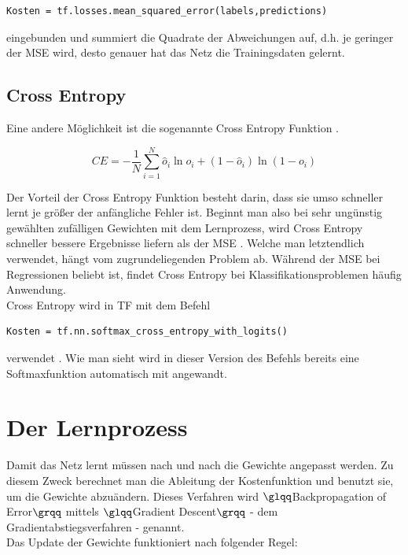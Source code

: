 \vspace{0.3cm}
\begin{lstlisting}
Kosten = tf.losses.mean_squared_error(labels,predictions)
\end{lstlisting}

eingebunden und summiert die Quadrate der Abweichungen auf, d.h. je geringer der \gls{MSE} wird, desto genauer hat das Netz die Trainingsdaten gelernt.


\subsection{Cross Entropy}
Eine andere M\"oglichkeit ist die sogenannte Cross Entropy Funktion \cite{Nielsen}.

\begin{equation}
CE= - \frac{1}{N} \sum_{i=1}^{N}\hat{o}_i \ln o_i + (1- \hat{o}_i) \ln (1-o_i)
\end{equation}

Der Vorteil der Cross Entropy Funktion besteht darin, dass sie umso schneller lernt je gr\"o\ss er der anf\"angliche Fehler ist. Beginnt man also bei sehr ung\"unstig gew\"ahlten zuf\"alligen Gewichten mit dem Lernprozess, wird Cross Entropy schneller bessere Ergebnisse liefern als der \gls{MSE} \cite{Nielsen}. Welche man letztendlich verwendet, h\"angt vom zugrundeliegenden Problem ab. Während der \gls{MSE} bei Regressionen beliebt ist, findet Cross Entropy bei Klassifikationsproblemen häufig Anwendung.\\
Cross Entropy wird in \gls{TF} mit dem Befehl

\vspace{0.3cm} 
\begin{lstlisting}
Kosten = tf.nn.softmax_cross_entropy_with_logits()
\end{lstlisting}

verwendet \cite{cookbook}. Wie man sieht wird in dieser Version des Befehls bereits eine Softmaxfunktion automatisch mit angewandt.



\section{Der Lernprozess}
Damit das Netz lernt m\"ussen nach und nach die Gewichte angepasst werden. Zu diesem Zweck berechnet man die Ableitung der Kostenfunktion und benutzt sie, um die Gewichte abzu\"andern. Dieses Verfahren wird $\glqq$Backpropagation of Error$\grqq$ mittels $\glqq$Gradient Descent$\grqq$ - dem Gradientabstiegsverfahren - genannt.\\
Das Update der Gewichte funktioniert nach folgender Regel: \cite{Rojas1996}

